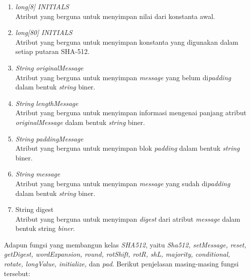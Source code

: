 \begin{enumerate}
	\item \textit{long[8] INITIALS} \\
	Atribut yang berguna untuk menyimpan nilai dari konstanta awal.
	\item \textit{long[80] INITIALS} \\
	Atribut yang berguna untuk menyimpan konstanta yang digunakan dalam setiap putaran SHA-512.
	\item \textit{String originalMessage} \\
	Atribut yang berguna untuk menyimpan \textit{message} yang belum di\textit{padding} dalam bentuk \textit{string} biner.
	\item \textit{String lengthMessage} \\
	Atribut yang berguna untuk menyimpan informasi mengenai panjang atribut \textit{originalMessage} dalam bentuk \textit{string} biner.
	\item \textit{String paddingMessage} \\
	Atribut yang berguna untuk menyimpan blok \textit{padding} dalam bentuk \textit{string} biner.
	\item \textit{String message} \\
	Atribut yang berguna untuk menyimpan \textit{message} yang sudah di\textit{padding} dalam bentuk \textit{string} biner.
	\item String digest \\
	Atribut yang berguna untuk menyimpan \textit{digest} dari atribut \textit{message} dalam bentuk string \textit{biner}.
\end{enumerate}

Adapun fungsi yang membangun kelas \textit{SHA512}, yaitu \textit{Sha512, setMessage, reset, getDigest, wordExpansion, round, rotShift, rotR, shL, majority, conditional, rotate, longValue, initialize,} dan \textit{pad}. Berikut penjelasan masing-masing fungsi tersebut:

